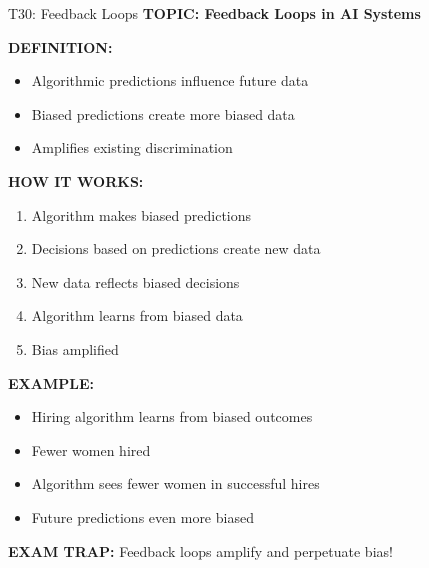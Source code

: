\documentclass[8pt]{beamer}
\begin{document}
	\begin{frame}{T30: Feedback Loops}
		\fontsize{6.5}{7.5}\selectfont
		\textbf{TOPIC: Feedback Loops in AI Systems}
		
		\vspace{0.1cm}
		\textbf{DEFINITION:}
		\begin{itemize}
			\item Algorithmic predictions influence future data
			\item Biased predictions create more biased data
			\item Amplifies existing discrimination
		\end{itemize}
		
		\vspace{0.1cm}
		\textbf{HOW IT WORKS:}
		\begin{enumerate}
			\item Algorithm makes biased predictions
			\item Decisions based on predictions create new data
			\item New data reflects biased decisions
			\item Algorithm learns from biased data
			\item Bias amplified
		\end{enumerate}
		
		\vspace{0.1cm}
		\textbf{EXAMPLE:}
		\begin{itemize}
			\item Hiring algorithm learns from biased outcomes
			\item Fewer women hired
			\item Algorithm sees fewer women in successful hires
			\item Future predictions even more biased
		\end{itemize}
		
		\textcolor{myred}{\textbf{EXAM TRAP:}} Feedback loops \textcolor{myblue}{amplify and perpetuate bias}!
	\end{frame}
	
\end{document}
